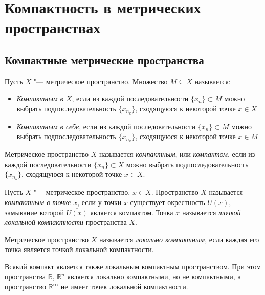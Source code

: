 \section{Компактность в метрических пространствах}

\subsection{Компактные метрические пространства}

\begin{definition}
Пусть $X$ "--- метрическое пространство. Множество $M \subseteq X$ называется:
    \begin{itemize}
        \item \textit{Компактным в $X$}, если из каждой последовательности $\{x_n\} \subset M$ можно выбрать подпоследовательность $\{x_{n_k}\}$, сходящуюся к некоторой точке $x \in X$
        \item \textit{Компактным в себе}, если из каждой последовательности $\{x_n\} \subset M$ можно выбрать подпоследовательность $\{x_{n_k}\}$, сходящуюся к некоторой точке $x \in M$
    \end{itemize}
\end{definition}

\begin{definition}
    Метрическое пространство $X$ называется \textit{компактным}, или \textit{компактом}, если из каждой последовательности $\{x_n\} \subset X$ можно выбрать подпоследовательность $\{x_{n_k}\}$, сходящуюся к некоторой точке $x \in X$.
\end{definition}

\begin{definition}
    Пусть $X$ "--- метрическое пространство, $x \in X$. Пространство $X$ называется \textit{компактным в точке $x$}, если у точки $x$ существует окрестность $U(x)$, замыкание которой $\overline{U(x)}$ является компактом. Точка $x$ называется \textit{точкой локальной компактности} пространства $X$.
\end{definition}

\begin{definition}
    Метрическое пространство $X$ называется \textit{локально компактным}, если каждая его точка является точкой локальной компактности.
\end{definition}

\begin{note}
    Всякий компакт является также локальным компактным пространством. При этом пространства $\mathbb R$, $\mathbb R^n$ является локально компактными, но не компактными, а пространство $\mathbb R^{\infty}$ не имеет точек локальной компактности.
\end{note}

